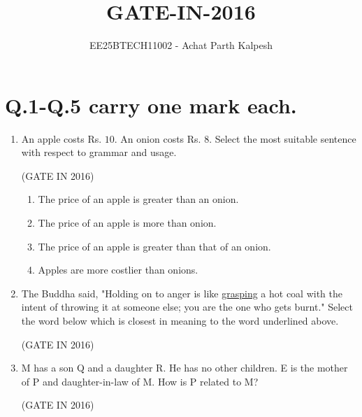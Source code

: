 \documentclass[journal,12pt,onecolumn]{IEEEtran}
\title{GATE-IN-2016}
\author{EE25BTECH11002 - Achat Parth Kalpesh }
\date{}
\theoremstyle{remark}
\begin{document}
\maketitle
\section*{Q.1-Q.5 carry one mark each. }

\begin{enumerate}
\item An apple costs Rs. $10$. An onion costs Rs. $8$.
Select the most suitable sentence with respect to grammar and usage.

\hfill{(GATE IN 2016)}
\begin{enumerate}

\item The price of an apple is greater than an onion.
\item The price of an apple is more than onion.
\item The price of an apple is greater than that of an onion.
\item Apples are more costlier than onions.

\end{enumerate}

\item The Buddha said, "Holding on to anger is like \underline{grasping} a hot coal with the intent of throwing it at someone else; you are the one who gets burnt."
Select the word below which is closest in meaning to the word underlined above.

\hfill{(GATE IN 2016)}
\begin{enumerate}
\end{enumerate}

\item M has a son Q and a daughter R. He has no other children. E is the mother of P and daughter-in-law of M. How is P related to M?

\hfill{(GATE IN 2016)}
\begin{enumerate}
\end{enumerate}


\end{enumerate}
\end{document}
